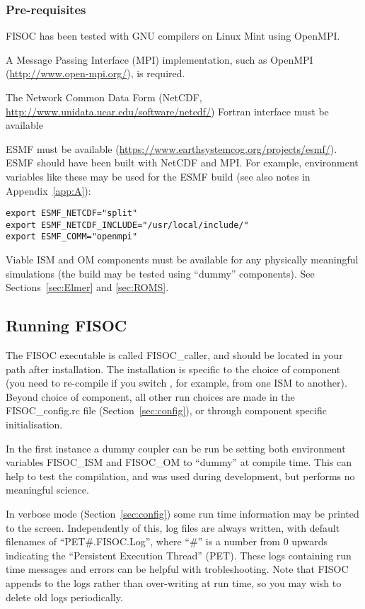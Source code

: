 \documentclass[12pt]{article}
\begin{document}
\subsubsection{Pre-requisites}
\label{sec:PreReq}

FISOC has been tested with GNU compilers on Linux Mint using OpenMPI. 

A Message Passing Interface (MPI) implementation, such as 
OpenMPI (\url{http://www.open-mpi.org/}), is required. 

The Network Common Data Form (NetCDF,  
\url{http://www.unidata.ucar.edu/software/netcdf/}) 
Fortran interface must be available 

ESMF must be available (\url{https://www.earthsystemcog.org/projects/esmf/}).  
ESMF should have been built with NetCDF and MPI.
For example, environment variables like these may be used for the ESMF build
(see also notes in Appendix~\ref{app:A}):
\begin{lstlisting}
export ESMF_NETCDF="split"
export ESMF_NETCDF_INCLUDE="/usr/local/include/"
export ESMF_COMM="openmpi"
\end{lstlisting}


Viable ISM and OM components must be available for any physically meaningful simulations
(the build may be tested using ``dummy'' components).  
See Sections~\ref{sec:Elmer} and \ref{sec:ROMS}.


\subsection{Running FISOC}

The FISOC executable is called FISOC\_caller, and should be located in your path after installation. 
The installation is specific to the choice of component (you need to re-compile if you switch , for 
example, from one ISM to another).  
Beyond choice of component, all other run choices are made in the FISOC\_config.rc file
(Section~\ref{sec:config}), 
or through component specific initialisation.

In the first instance a dummy coupler can be run be setting both environment variables FISOC\_ISM and 
FISOC\_OM to ``dummy'' at compile time.  This can help to test the compilation, and was used during development, 
but performs no meaningful science.  

In verbose mode (Section~\ref{sec:config}) some run time information may be printed to the screen.  
Independently of this, log files are always written, 
with default filenames of ``PET\#.FISOC.Log'', where ``\#'' is a number from 0 upwards indicating the 
``Persistent Execution Thread'' (PET). 
These logs containing run time messages and errors can be helpful with trobleshooting.
Note that FISOC appends to the logs rather than over-writing at run time, so you may wish to delete old logs 
periodically. 
\end{document}

